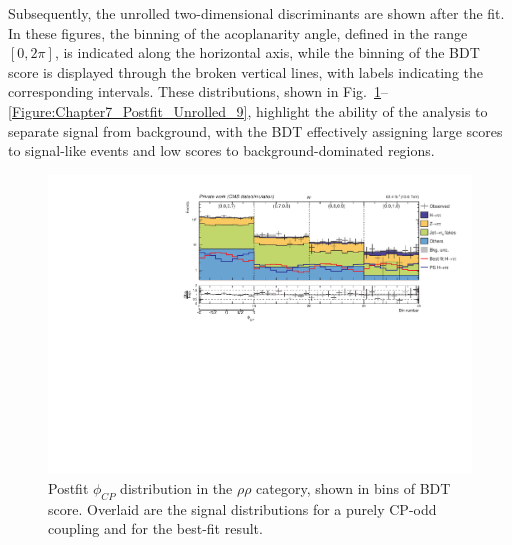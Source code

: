Subsequently, the unrolled two-dimensional discriminants are shown after the fit. In these figures, the binning of the acoplanarity angle, defined in the range $[0,2\pi]$, is indicated along the horizontal axis, while the binning of the BDT score is displayed through the broken vertical lines, with labels indicating the corresponding intervals. These distributions, shown in Fig.~\ref{Figure:Chapter7_Postfit_Unrolled_1}--\ref{Figure:Chapter7_Postfit_Unrolled_9}, highlight the ability of the analysis to separate signal from background, with the \ac{BDT} effectively assigning large scores to signal-like events and low scores to background-dominated regions.

\begin{figure}[!htbp]
    \centering
    \includegraphics[width=1\textwidth]{Figures/Chapter7/postfit/htt_tt_3_13p6TeV.pdf}
    \caption[Postfit $\phi_{CP}$ distribution in the $\rho\rho$ category.]
    {Postfit $\phi_{CP}$ distribution in the $\rho\rho$ category, shown in bins of \ac{BDT} score. Overlaid are the signal distributions for a purely CP-odd coupling and for the best-fit result.}

    \label{Figure:Chapter7_Postfit_Unrolled_1}
\end{figure}

